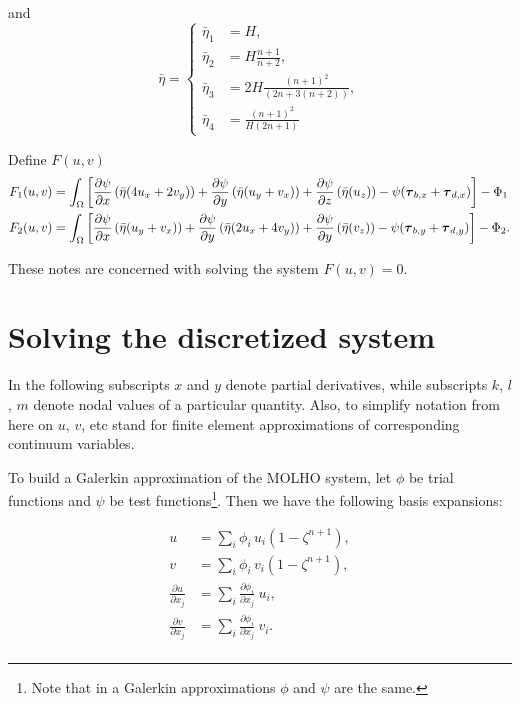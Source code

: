 \documentclass{amsart}
\newcommand{\T}{\boldsymbol{\tau}}
\newcommand{\I}{\ensuremath{\int_{\Omega}}}
\newcommand{\diff}[2]{\ensuremath{\frac{\partial #1}{\partial #2}}}
\newcommand{\basalshearstress}[1]{\T_{b#1}}
\newcommand{\taubx}{\basalshearstress{,x}}
\newcommand{\tauby}{\basalshearstress{,y}}
\newcommand{\drivingstress}[1]{\T_{d#1}}
\newcommand{\taudx}{\drivingstress{,x}}
\newcommand{\taudy}{\drivingstress{,y}}
\begin{document}
and
\begin{equation}
  \bar \eta = \left\{
  \begin{array}{rl}
    \bar \eta_1 & =  H, \\
    \bar \eta_2 & =  H \frac{n+1}{n+2}, \\
    \bar \eta_3 & = 2H \frac{(n+1)^2}{(2n+3(n+2))}, \\
    \bar \eta_4 & =  \frac{(n+1)^2}{H(2n+1)}
  \end{array} \right.
\end{equation}


Define $F(u,v)$
\begin{align}
  \label{eq:10}
  F_{1}(u,v) &=  \I \left[ \diff{\psi}{x} \left( \bar\eta (\Mux) \right) + \diff{\psi}{y} \left( \bar\eta (\Muy) \right) + \diff{\psi}{z} \left( \bar \eta (\Muz) \right) - \psi (\taubx + \taudx) \right] - \Phi_{1}\\
  \label{eq:11}
  F_{2}(u,v) &= \I \left[ \diff{\psi}{x} \left( \bar\eta (\Mvx) \right) + \diff{\psi}{y} \left( \bar \eta (\Mvy) \right) + \diff{\psi}{y} \left(\bar \eta (\Mvz) \right) - \psi (\tauby + \taudy) \right] - \Phi_{2}.
\end{align}

These notes are concerned with solving the system $F(u,v) = 0$.

\section{Solving the discretized system}
\label{sec-3}

In the following subscripts $x$ and $y$ denote partial derivatives, while subscripts $k$, $l$, $m$ denote nodal values of a particular quantity. Also, to simplify notation from here on $u$, $v$, etc stand for finite element approximations of corresponding continuum variables.

To build a Galerkin approximation of the MOLHO system, let $\phi$ be trial functions and $\psi$ be test functions\footnote{Note that in a Galerkin approximations $\phi$ and $\psi$ are the same.}. Then we have the following basis expansions:

\begin{equation}
  \label{eq:12}
  \begin{aligned}
    u & = \sum_i \phi_i\, u_i \left(1-\zeta^{n+1}\right), \\
    v & = \sum_i \phi_i\, v_i \left(1-\zeta^{n+1}\right),\\
    \diff{u}{x_j} & = \sum_i \diff{\phi_i}{x_j}\ u_i,\\
    \diff{v}{x_j} & = \sum_i \diff{\phi_i}{x_j}\ v_i.\\
  \end{aligned}
\end{equation}
\end{document}
